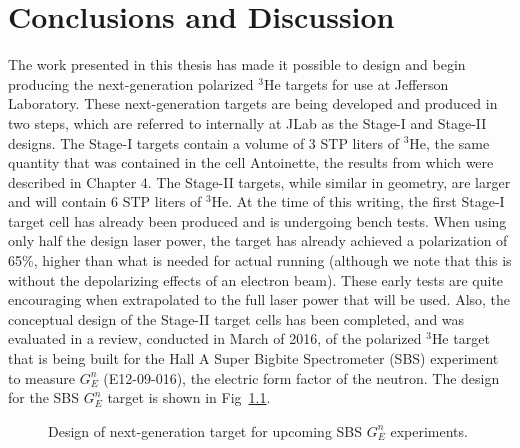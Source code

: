 \chapter{Conclusions and Discussion}
\label{conclutions}

The work presented in this thesis has made it possible to design and begin producing the next-generation polarized $^3$He targets for use at Jefferson Laboratory. These next-generation targets are being developed and produced in two steps, which are referred to internally at JLab as the Stage-I and Stage-II designs. The Stage-I targets contain a volume of 3 STP liters of $^3$He, the same quantity that was contained in the cell Antoinette, the results from which were described in Chapter 4. The Stage-II targets, while similar in geometry, are larger and will contain 6 STP liters of $^3$He. At the time of this writing, the first Stage-I target cell has already been produced and is undergoing bench tests. When using only half the design laser power, the target has already achieved a polarization of 65\%, higher than what is needed for actual running (although we note that this is without the depolarizing effects of an electron beam). These early tests are quite encouraging when extrapolated to the full laser power that
will be used. Also, the conceptual design of the Stage-II target cells has been 
completed, and was evaluated in a review, conducted in March of 2016, of the polarized $^3$He target that is being built for the Hall A Super Bigbite Spectrometer (SBS) experiment to measure $G_E^n$ (E12-09-016), the electric form factor of the neutron. The design for the SBS $G_E^n$ target is shown in Fig~\ref{Next_Gen_Design}.

\begin{figure}[t!]
	\centering
	\caption{{Design of next-generation target for upcoming SBS $G_E^n$ experiments.}}
	\label{Next_Gen_Design}
\end{figure}

